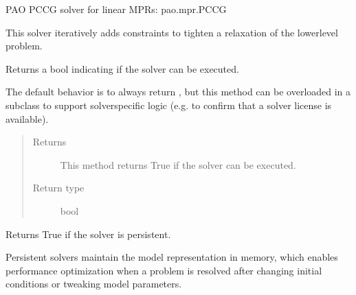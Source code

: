\documentclass[letterpaper,10pt,english]{sphinxmanual}
\begin{document}
\begin{fulllineitems}
\label{\detokenize{reference/mpr:pao.mpr.solvers.pccg.LinearMultilevelSolver_PCCG}}
PAO PCCG solver for linear MPRs: pao.mpr.PCCG

This solver iteratively adds constraints to tighten a relaxation of the lower\sphinxhyphen{}level problem.

\begin{fulllineitems}
\label{\detokenize{reference/mpr:pao.mpr.solvers.pccg.LinearMultilevelSolver_PCCG.available}}
Returns a bool indicating if the solver can be executed.

The default behavior is to always return , but this method
can be overloaded in a subclass to support solver\sphinxhyphen{}specific logic
(e.g.  to confirm that a solver license is available).
\begin{quote}\begin{description}
\item[{Returns}] \leavevmode
This method returns True if the solver can be executed.

\item[{Return type}] \leavevmode
bool

\end{description}\end{quote}

\end{fulllineitems}


\begin{fulllineitems}
\label{\detokenize{reference/mpr:pao.mpr.solvers.pccg.LinearMultilevelSolver_PCCG.is_persistent}}
Returns True if the solver is persistent.

Persistent solvers maintain the model representation in memory,
which enables performance optimization when a problem is resolved
after changing initial conditions or tweaking model parameters.


\end{fulllineitems}
\end{fulllineitems}
\end{document}
